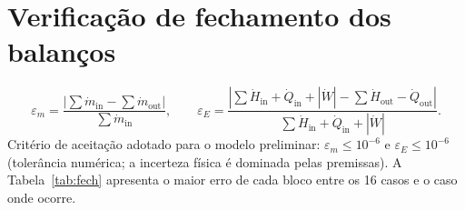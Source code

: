 \documentclass[11pt,a4paper]{article}
\numberwithin{equation}{section}
\numberwithin{table}{section}
\numberwithin{figure}{section}
\begin{document}
\section{Verificação de fechamento dos balanços}\label{sec:fechamento}
\begin{equation}
\varepsilon_m=\frac{\left|\sum\dot m_{\mathrm{in}}-\sum\dot m_{\mathrm{out}}\right|}{\sum\dot m_{\mathrm{in}}},\qquad
\varepsilon_E=\frac{\left|\sum\dot H_{\mathrm{in}}+\dot Q_{\mathrm{in}}+|\dot W|-\sum\dot H_{\mathrm{out}}-\dot Q_{\mathrm{out}}\right|}{\sum\dot H_{\mathrm{in}}+\dot Q_{\mathrm{in}}+|\dot W|}.
\end{equation}
Critério de aceitação adotado para o modelo preliminar: $\varepsilon_m\le10^{-6}$ e $\varepsilon_E\le10^{-6}$ (tolerância numérica; a incerteza física é dominada pelas premissas). A Tabela~\ref{tab:fech} apresenta o maior erro de cada bloco entre os 16 casos e o caso onde ocorre.
\end{document}
